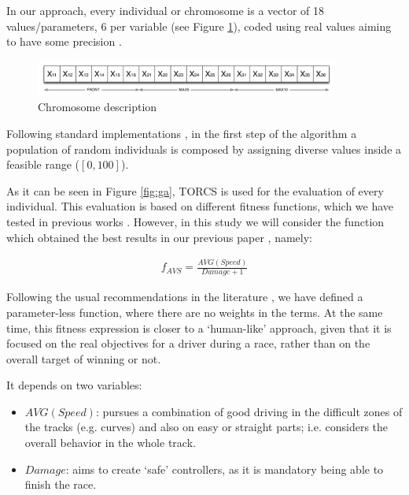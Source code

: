 \documentclass[10pt,journal,compsoc]{IEEEtran}
\begin{document}
In our approach, every individual or chromosome is a vector of 18
values/parameters, 6 per variable (see Figure \ref {fig:cromosome}),
coded using real values aiming to have some precision
\cite{elsayed13}. 

 \begin{figure}[!ht]	
 	\begin{center}
 		\includegraphics[width=10cm]{fig/chromosome2.png}
 		\caption{Chromosome description}
 		\label{fig:cromosome}	
 	\end{center}	
 \end{figure}

Following standard implementations \cite{GAs_Goldberg89}, in the first step of the algorithm \cite{salem_evo17} a population of random individuals is composed by assigning diverse values inside a feasible range ($[0,100]$).

As it can be seen in Figure \ref{fig:ga}, TORCS is used for the
evaluation of every individual. This evaluation is based on different
fitness functions, which we have tested in previous works
\cite{salem_evo18}.  %
However, in this study we will consider the function which obtained the best results in our previous paper \cite{salem_cig2018}, namely:

 \begin{equation} \label{fit2}
 	\begin{array}{lll}
 		f_{AVS}= \frac{AVG(Speed)}{Damage+1}
 	\end{array}
 \end{equation}	

Following the usual recommendations in the literature \cite{Harik-ParameterLess99}, we have defined a parameter-less function, where there are no weights in the terms.
At the same time, this fitness expression is closer to a `human-like' approach, given that it is focused on the real objectives for a driver during a race, rather than on the overall target of winning or not. 

It depends on two variables:

 \begin{itemize}
 	\item $AVG(Speed)$: pursues a combination of good driving in
          the difficult zones of the tracks (e.g. curves) and also on
          easy or straight parts; i.e. considers the overall behavior
          in the whole track. %
 	\item $Damage$: aims to create `safe' controllers, as it is
          mandatory being able to finish the race. %
 \end{itemize} 
\end{document}
